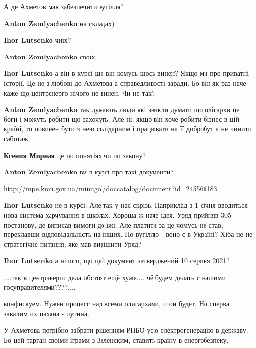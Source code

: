 \begin{itemize}
А де Ахметов мав забезпечити вугілля?

\begin{itemize} %
\textbf{Anton Zemlyachenko} на складах)

\textbf{Ihor Lutsenko} чиїх?

\textbf{Anton Zemlyachenko} своїх

\textbf{Ihor Lutsenko} а він в курсі що він комусь щось винен? Якщо ми про приватні історії.
Це не з любові до Ахметова а справедливості заради.
Бо він як раз наче каже що центренерго нічого не винен. Чи не так?

\textbf{Anton Zemlyachenko} так думають люди які звикли думати що олігархи це боги і можуть робити що захочуть. Але ні, якщо він хоче робити бізнес в цій країні, то повинен бути з нею солідарним і працювати на її добробут а не чинити саботаж

\textbf{Ксения Мирная} це по понятіях чи по закону?

\textbf{Anton Zemlyachenko} ви в курсі про такі документи?

\url{http://mpe.kmu.gov.ua/minugol/doccatalog/document?id=245566183}

\textbf{Ihor Lutsenko} не в курсі. Але так у нас скрізь.
Наприклад з 1 січня вводиться нова система харчування в школах. Хороша ж наче ідея. Уряд прийняв 305 постанову, де виписав вимоги до їжі. Але платити за це чомусь не став, переклавши відповідальність на інших.
По вугіллю - воно є в Україні? Хіба не не стратегічне питання, яке мав вирішити Уряд?

\textbf{Ihor Lutsenko} а нічого, що цей документ затверджений 10 серпня 2021?

\end{itemize} %

....так в центрэнерго дела обстоят ещё хуже.... чё будем делать с нашими госуправителями????....

конфискуем. Нужен процесс над всеми олигархами, и он будет. Но сперва завалим их пахана - путина.

У Ахметова потрібно забрати рішенням РНБО усю електрогенерацію в державу. Бо цей
тарган своіми іграми з Зеленским, ставить країну в енергобезпеку.



\end{itemize}
